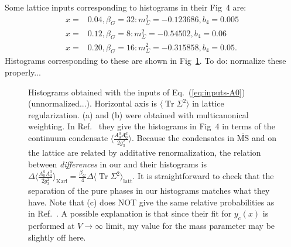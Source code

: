 \documentclass[11pt,a4paper]{article}
\newcommand\Tr{\operatorname{Tr}}
\newcommand\MSbar{$\overline{\text{MS}}$ } %
\newcommand\lauri[1]{{\color{myorange}#1}}
\begin{document}
Some lattice inputs corresponding to histograms in their Fig~4 are:
\begin{align}
\label{eq:inputs-A0}
x =& 0.04, \beta_G = 32: m^2_\Sigma = -0.123686, b_4 = 0.005 \\ 
x =& 0.12, \beta_G = 8: m^2_\Sigma = -0.54502, b_4 = 0.06 \\
x =& 0.20, \beta_G = 16: m^2_\Sigma = -0.315858, b_4 = 0.05.
\end{align}   
Histograms corresponding to these are shown in Fig~\ref{fig:A0_only}. \lauri{To do: normalize these properly...}
\begin{figure}[H]
	\centering
	\caption{Histograms obtained with the inputs of Eq.~(\ref{eq:inputs-A0}) (unnormalized...). Horizontal axis is $\langle\Tr\Sigma^2\rangle$ in lattice regularization. (a) and (b) were obtained with multicanonical weighting. In Ref.~\cite{Kajantie:1997tt} they give the histograms in Fig~4 in terms of the continuum condensate $\langle \frac{A^a_0 A^a_0}{2g^2_3} \rangle$. Because the condensates in \MSbar and on the lattice are related by additative renormalization, the relation between \textit{differences} in our and their histograms is $\Delta\langle \frac{A^a_0 A^a_0}{2g^2_3} \rangle_\text{Kari} = \frac{\beta_G}{4}\Delta\langle \Tr\Sigma^2\rangle_\text{latt}$. It is straightforward to check that the separation of the pure phases in our histograms matches what they have. \lauri{Note that (c) does NOT give the same relative probabilities as in Ref.~\cite{Kajantie:1997tt}. A possible explanation is that since their fit for $y_c(x)$ is performed at $V \rightarrow \infty$ limit, my value for the mass parameter may be slightly off here.}} 
	\label{fig:A0_only}
\end{figure}
\end{document}
